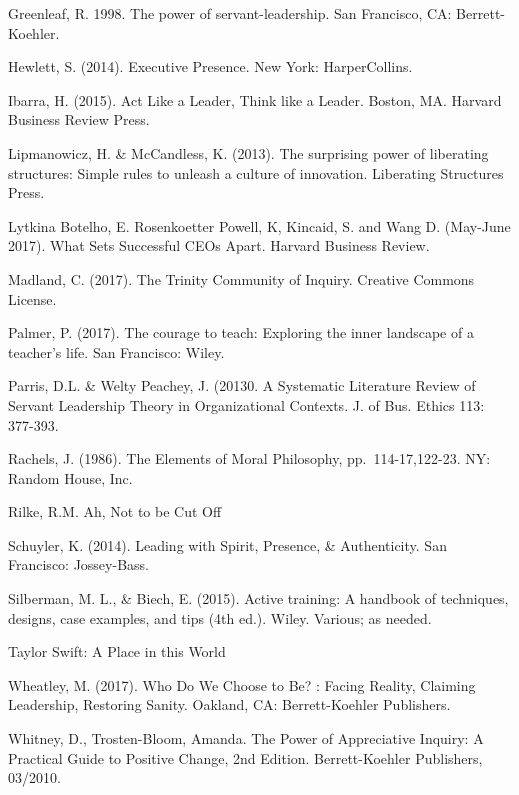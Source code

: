 \documentclass[
]{book}
\begin{document}
Greenleaf, R. 1998. The power of servant-leadership. San Francisco, CA: Berrett-Koehler.

Hewlett, S. (2014). Executive Presence. New York: HarperCollins.

Ibarra, H. (2015). Act Like a Leader, Think like a Leader. Boston, MA. Harvard Business Review Press.

Lipmanowicz, H. \& McCandless, K. (2013). The surprising power of liberating structures: Simple rules to unleash a culture of innovation. Liberating Structures Press.

Lytkina Botelho, E. Rosenkoetter Powell, K, Kincaid, S. and Wang D. (May-June 2017). What Sets Successful CEOs Apart. Harvard Business Review.

Madland, C. (2017). The Trinity Community of Inquiry. Creative Commons License.

Palmer, P. (2017). The courage to teach: Exploring the inner landscape of a teacher's life. San Francisco: Wiley.

Parris, D.L. \& Welty Peachey, J. (20130. A Systematic Literature Review of Servant Leadership Theory in Organizational Contexts. J. of Bus. Ethics 113: 377-393.

Rachels, J. (1986). The Elements of Moral Philosophy, pp.~114-17,122-23. NY: Random House, Inc.

Rilke, R.M. Ah, Not to be Cut Off

Schuyler, K. (2014). Leading with Spirit, Presence, \& Authenticity. San Francisco: Jossey-Bass.

Silberman, M. L., \& Biech, E. (2015). Active training: A handbook of techniques, designs, case examples, and tips (4th ed.). Wiley. Various; as needed.

Taylor Swift: A Place in this World

Wheatley, M. (2017). Who Do We Choose to Be? : Facing Reality, Claiming Leadership, Restoring Sanity. Oakland, CA: Berrett-Koehler Publishers.

Whitney, D., Trosten-Bloom, Amanda. The Power of Appreciative Inquiry: A Practical Guide to Positive Change, 2nd Edition. Berrett-Koehler Publishers, 03/2010.

  
\end{document}
